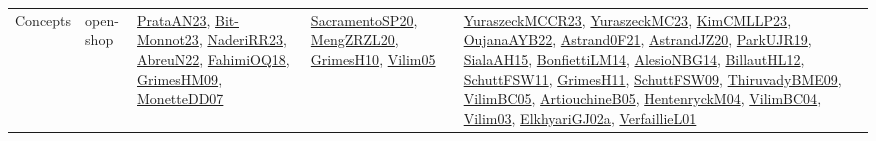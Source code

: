 {\begin{longtable}{lp{3cm}>{\raggedright}p{6cm}>{\raggedright}p{6cm}p{8cm}}
Concepts & open-shop & \href{articles/PrataAN23.pdf}{PrataAN23}\cite{PrataAN23}, \href{papers/Bit-Monnot23.pdf}{Bit-Monnot23}\cite{Bit-Monnot23}, \href{articles/NaderiRR23.pdf}{NaderiRR23}\cite{NaderiRR23}, \href{articles/AbreuN22.pdf}{AbreuN22}\cite{AbreuN22}, \href{articles/FahimiOQ18.pdf}{FahimiOQ18}\cite{FahimiOQ18}, \href{papers/GrimesHM09.pdf}{GrimesHM09}\cite{GrimesHM09}, \href{papers/MonetteDD07.pdf}{MonetteDD07}\cite{MonetteDD07} & \href{articles/SacramentoSP20.pdf}{SacramentoSP20}\cite{SacramentoSP20}, \href{articles/MengZRZL20.pdf}{MengZRZL20}\cite{MengZRZL20}, \href{papers/GrimesH10.pdf}{GrimesH10}\cite{GrimesH10}, \href{papers/Vilim05.pdf}{Vilim05}\cite{Vilim05} & \href{articles/YuraszeckMCCR23.pdf}{YuraszeckMCCR23}\cite{YuraszeckMCCR23}, \href{papers/YuraszeckMC23.pdf}{YuraszeckMC23}\cite{YuraszeckMC23}, \href{papers/KimCMLLP23.pdf}{KimCMLLP23}\cite{KimCMLLP23}, \href{papers/OujanaAYB22.pdf}{OujanaAYB22}\cite{OujanaAYB22}, \href{papers/Astrand0F21.pdf}{Astrand0F21}\cite{Astrand0F21}, \href{articles/AstrandJZ20.pdf}{AstrandJZ20}\cite{AstrandJZ20}, \href{papers/ParkUJR19.pdf}{ParkUJR19}\cite{ParkUJR19}, \href{papers/SialaAH15.pdf}{SialaAH15}\cite{SialaAH15}, \href{papers/BonfiettiLM14.pdf}{BonfiettiLM14}\cite{BonfiettiLM14}, \href{papers/AlesioNBG14.pdf}{AlesioNBG14}\cite{AlesioNBG14}, \href{papers/BillautHL12.pdf}{BillautHL12}\cite{BillautHL12}, \href{articles/SchuttFSW11.pdf}{SchuttFSW11}\cite{SchuttFSW11}, \href{papers/GrimesH11.pdf}{GrimesH11}\cite{GrimesH11}, \href{papers/SchuttFSW09.pdf}{SchuttFSW09}\cite{SchuttFSW09}, \href{papers/ThiruvadyBME09.pdf}{ThiruvadyBME09}\cite{ThiruvadyBME09}, \href{articles/VilimBC05.pdf}{VilimBC05}\cite{VilimBC05}, \href{papers/ArtiouchineB05.pdf}{ArtiouchineB05}\cite{ArtiouchineB05}, \href{papers/HentenryckM04.pdf}{HentenryckM04}\cite{HentenryckM04}, \href{papers/VilimBC04.pdf}{VilimBC04}\cite{VilimBC04}, \href{papers/Vilim03.pdf}{Vilim03}\cite{Vilim03}, \href{papers/ElkhyariGJ02a.pdf}{ElkhyariGJ02a}\cite{ElkhyariGJ02a}, \href{papers/VerfaillieL01.pdf}{VerfaillieL01}\cite{VerfaillieL01}\\

\end{longtable}}
